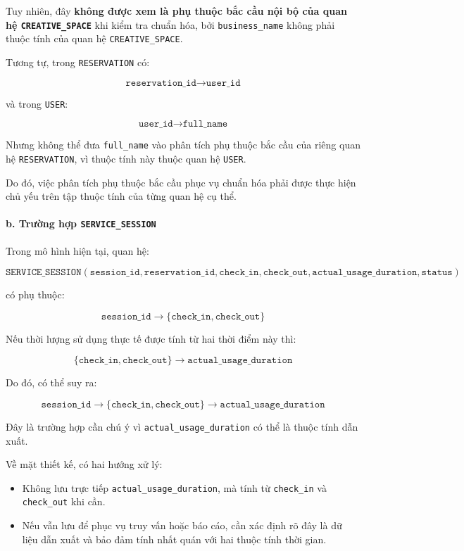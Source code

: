 Tuy nhiên, đây \textbf{không được xem là phụ thuộc bắc cầu nội bộ của quan hệ \texttt{CREATIVE\_SPACE}} khi kiểm tra chuẩn hóa, bởi \texttt{business\_name} không phải thuộc tính của quan hệ \texttt{CREATIVE\_SPACE}.

Tương tự, trong \texttt{RESERVATION} có:

$$
\texttt{reservation\_id}
\rightarrow
\texttt{user\_id}
$$

và trong \texttt{USER}:

$$
\texttt{user\_id}
\rightarrow
\texttt{full\_name}
$$

Nhưng không thể đưa \texttt{full\_name} vào phân tích phụ thuộc bắc cầu của riêng quan hệ \texttt{RESERVATION}, vì thuộc tính này thuộc quan hệ \texttt{USER}.

Do đó, việc phân tích phụ thuộc bắc cầu phục vụ chuẩn hóa phải được thực hiện chủ yếu trên tập thuộc tính của từng quan hệ cụ thể.

\paragraph{b. Trường hợp \texttt{SERVICE\_SESSION}}\mbox{}\par

Trong mô hình hiện tại, quan hệ:

$$ \texttt{SERVICE\_SESSION}( \texttt{session\_id}, \texttt{reservation\_id}, \texttt{check\_in}, \texttt{check\_out}, \texttt{actual\_usage\_duration}, \texttt{status}) $$

có phụ thuộc:

$$
\texttt{session\_id}
\rightarrow
\{
\texttt{check\_in},
\texttt{check\_out}
\}
$$

Nếu thời lượng sử dụng thực tế được tính từ hai thời điểm này thì:

$$
\{
\texttt{check\_in},
\texttt{check\_out}
\}
\rightarrow
\texttt{actual\_usage\_duration}
$$

Do đó, có thể suy ra:

$$
\texttt{session\_id}
\rightarrow
\{
\texttt{check\_in},
\texttt{check\_out}
\}
\rightarrow
\texttt{actual\_usage\_duration}
$$

Đây là trường hợp cần chú ý vì \texttt{actual\_usage\_duration} có thể là thuộc tính dẫn xuất.

Về mặt thiết kế, có hai hướng xử lý:

\begin{itemize}
\item Không lưu trực tiếp \texttt{actual\_usage\_duration}, mà tính từ \texttt{check\_in} và \texttt{check\_out} khi cần.

\item Nếu vẫn lưu để phục vụ truy vấn hoặc báo cáo, cần xác định rõ đây là dữ liệu dẫn xuất và bảo đảm tính nhất quán với hai thuộc tính thời gian.

\end{itemize}

